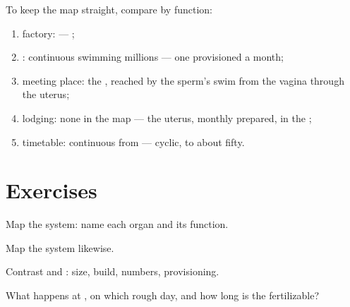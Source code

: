 \begin{method}\label{met:g8:reproductive-systems:sides}
To keep the map straight, compare by function:
\begin{enumerate}
  \item {} factory:  --- ;
  \item {}: continuous swimming millions --- one
        provisioned  a month;
  \item meeting place: the , reached by the sperm's
        swim from the vagina through the uterus;
  \item lodging: none in the  map --- the uterus,
        monthly prepared, in the ;
  \item timetable: continuous from  --- cyclic,
         to about fifty.
\end{enumerate}
\end{method}

\section{Exercises}

\begin{exercise}[$\star$]\label{exo:g8:reproductive-systems:1}
Map the  system: name each organ and its function.
\end{exercise}

\begin{exercise}[$\star$]\label{exo:g8:reproductive-systems:2}
Map the  system likewise.
\end{exercise}

\begin{exercise}[$\star$]\label{exo:g8:reproductive-systems:3}
Contrast  and : size, build, numbers,
provisioning.
\end{exercise}

\begin{exercise}[$\star$]\label{exo:g8:reproductive-systems:4}
What happens at , on which rough day, and how
long is the  fertilizable?
\end{exercise}


